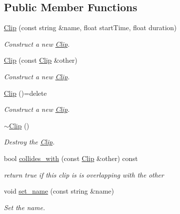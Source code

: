 \subsection*{Public Member Functions}
\begin{DoxyCompactItemize}
\item 
\mbox{\hyperlink{classprz_1_1_clip_a8ca22ea87ef621e73273048b7f950918}{Clip}} (const string \&name, float start\+Time, float duration)
\begin{DoxyCompactList}\small\item\em Construct a new \mbox{\hyperlink{classprz_1_1_clip}{Clip}}. \end{DoxyCompactList}\item 
\mbox{\hyperlink{classprz_1_1_clip_aaa01a03347274e920e2c1957ff05afc5}{Clip}} (const \mbox{\hyperlink{classprz_1_1_clip}{Clip}} \&other)
\begin{DoxyCompactList}\small\item\em Construct a new \mbox{\hyperlink{classprz_1_1_clip}{Clip}}. \end{DoxyCompactList}\item 
\mbox{\hyperlink{classprz_1_1_clip_ad6f80ee3d0daf8dace945abf9494180e}{Clip}} ()=delete
\begin{DoxyCompactList}\small\item\em Construct a new \mbox{\hyperlink{classprz_1_1_clip}{Clip}}. \end{DoxyCompactList}\item 
\mbox{\hyperlink{classprz_1_1_clip_ad59d81a794768f8fac2285b704b26ceb}{$\sim$\+Clip}} ()
\begin{DoxyCompactList}\small\item\em Destroy the \mbox{\hyperlink{classprz_1_1_clip}{Clip}}. \end{DoxyCompactList}\item 
bool \mbox{\hyperlink{classprz_1_1_clip_a9dfa0b18535130c4b1f69e2f25d08c05}{collides\+\_\+with}} (const \mbox{\hyperlink{classprz_1_1_clip}{Clip}} \&other) const
\begin{DoxyCompactList}\small\item\em return true if this clip is is overlapping with the other \end{DoxyCompactList}\item 
void \mbox{\hyperlink{classprz_1_1_clip_a4228c95183be5c9e2bd9eabd58828243}{set\+\_\+name}} (const string \&name)
\begin{DoxyCompactList}\small\item\em Set the name. \end{DoxyCompactList}\item 

\end{DoxyCompactItemize}
